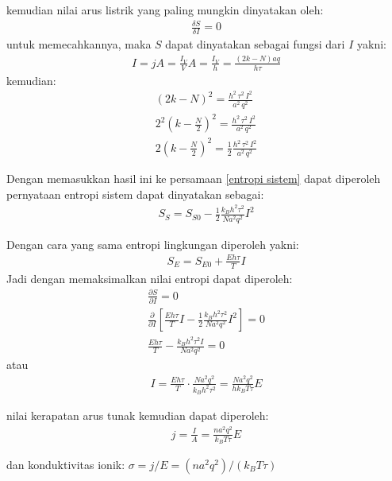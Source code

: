 \documentclass[a4paper , 12pt, cc]{article}
\begin{document}
kemudian nilai arus listrik yang paling mungkin dinyatakan oleh:
\begin{align}
\frac{\delta S}{\delta I} =  0 
\end{align}
untuk memecahkannya, maka $S$ dapat dinyatakan sebagai fungsi dari $I$ yakni:
\begin{align}
	I = j A =  \frac{I_V}{V} A = \frac{I_V}{h}  = \frac{(2k - N) aq}{h \tau }
\end{align}
kemudian:
\begin{align}
(2 k - N)^2  = \frac{h^2 \, \tau^2 \, I^2 }{a^2\, q^2}  \nonumber \\
2^2 \left( k - \frac{N}{2}\right)^2 = \frac{h^2 \, \tau^2 \, I^2 }{a^2\, q^2}  \nonumber \\
2 \left( k - \frac{N}{2}\right)^2 = \frac{1}{2} \frac{h^2 \, \tau^2 \, I^2 }{a^2\, q^2}
\end{align}

Dengan memasukkan hasil ini ke persamaan \ref{entropi sistem} dapat diperoleh pernyataan entropi sistem dapat dinyatakan  sebagai:
\begin{align}
S_S = S_{S0}  - \frac{1}{2} \frac{k_B  h^2  \tau^2 }{Na^2  q^2 } I^2 
\end{align}

Dengan cara yang sama entropi lingkungan diperoleh yakni:
\begin{align}
S_E = S_{E0} +  \frac{Eh \tau }{T} I 
\end{align}
Jadi dengan memaksimalkan nilai entropi dapat diperoleh:
\begin{align}
\frac{\partial S}{\partial I} = 0  \nonumber \\
\frac{\partial }{\partial I} \left[ \frac{Eh \tau}{T} I - \frac{1}{2} \frac{k_B h^2 \tau^2  }{N a^2 q^2 } I^2 \right] = 0 \nonumber \\
 \frac{Eh\tau }{T} - \frac{k_B h^2 \tau^2 I}{N a^2 q^2}  = 0 \nonumber 
\end{align}
atau 
\begin{align}
 I = \frac{Eh \tau }{T} \cdot \frac{Na^2 q^2 }{k_B h^2 \tau^2 }  = \frac{N a^2 q^2 }{h k_B  T \tau } E
\end{align}


nilai kerapatan arus tunak  kemudian dapat diperoleh:
\begin{align}
j = \frac{I}{A} = \frac{na^2  q^2 }{k_B T \tau } E
\end{align}

dan konduktivitas ionik: $\boxed{\sigma = j/E = (n a^2 q^2)/ (k_B T \tau )}$
\end{document}
